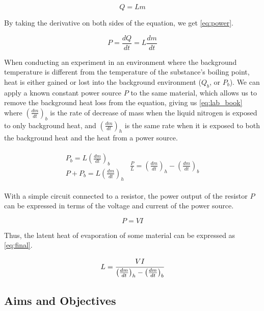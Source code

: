 \documentclass{article}
\begin{document}
\begin{equation}\label{eq:latent}
  Q = Lm
\end{equation}

By taking the derivative on both sides of the equation, we get \eqref{eq:power}.

\begin{equation}\label{eq:power}
  P = \frac{dQ}{dt} = L \frac{dm}{dt}
\end{equation}

When conducting an experiment in an environment where the background temperature is different from the temperature of the substance's boiling point, heat is either gained or lost into the background environment ($Q_b$, or $P_b$). We can apply a known constant power source $P$ to the same material, which allows us to remove the background heat loss from the equation, giving us \eqref{eq:lab_book} where $\left( \frac{dm}{dt} \right)_b$ is the rate of decrease of mass when the liquid nitrogen is exposed to only background heat, and $\left( \frac{dm}{dt} \right)_h$ is the same rate when it is exposed to both the background heat and the heat from a power source.

\begin{align}
\begin{split}
  P_{b} = L \left( \frac{dm}{dt} \right)_b \\
  P + P_b = L \left( \frac{dm}{dt} \right)_h
\end{split}
\begin{split}\label{eq:lab_book}
  \frac{P}{L} = \left( \frac{dm}{dt} \right)_h - \left( \frac{dm}{dt} \right)_b
\end{split}
\end{align}

With a simple circuit connected to a resistor, the power output of the resistor $P$ can be expressed in terms of the voltage and current of the power source.

\begin{equation}\label{eq:resistor}
  P = VI
\end{equation}

Thus, the latent heat of evaporation of some material can be expressed as \eqref{eq:final}.

\begin{equation}\label{eq:final}
  L = \cfrac{VI}{\left( \frac{dm}{dt} \right)_h - \left( \frac{dm}{dt} \right)_b}
\end{equation}

\subsection{Aims and Objectives}
\end{document}
